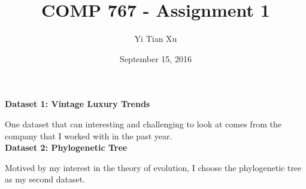 \documentclass[12pt]{article}
\begin{document}
\title{COMP 767 - Assignment 1}
\author{Yi Tian Xu}
\date{September 15, 2016}
\maketitle

{\bf Dataset 1: Vintage Luxury Trends\\}

One dataset that can interesting and challenging to look at comes from the company that I worked with in the past year.\\ 


{\bf Dataset 2: Phylogenetic Tree \\}

Motived by my interest in the theory of evolution, I choose the phylogenetic tree as my second dataset. 
\end{document}
